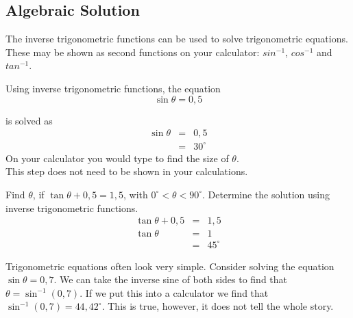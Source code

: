 \subsection{Algebraic Solution}
The inverse trigonometric functions can be used to solve trigonometric equations. These may be shown as second functions on your calculator: $sin^{-1}$, $cos^{-1}$ and $tan^{-1}$.

Using inverse trigonometric functions, the equation
\begin{equation*}
\sin \theta = 0,5
\end{equation*}

is solved as
\begin{eqnarray*}
\sin \theta &=&0,5\\
&=&30^{\circ}
\end{eqnarray*}
On your calculator you would type  \fbox{\raisebox{0cm}[8pt][1pt]{$($}} \fbox{\raisebox{0cm}[8pt][1pt]{$0,5$}} \fbox{\raisebox{0cm}[8pt][1pt]{$)$}} \fbox{\raisebox{0cm}[8pt][1pt]{$=$}} to find the size of $\theta$.\\
\newline
This step does not need to be shown in your calculations.

\begin{wex}{}{Find $\theta$, if $\tan \theta + 0,5=1,5$, with $0^{\circ}<\theta<90^{\circ}$. Determine the solution using inverse trigonometric functions.\\}{
\begin{eqnarray*}
\tan \theta + 0,5&=&1,5\\
\tan \theta &=&1\\
&=&45^{\circ}
\end{eqnarray*}}
\end{wex}

Trigonometric equations often look very simple. Consider solving the equation $\sin\theta=0,7$. We can take the inverse sine of both sides to find that $\theta=\sin^{-1}(0,7)$. If we put this into a calculator we find that $\sin^{-1}(0,7)=44,42^\circ$. This is true, however, it does not tell the whole story.

